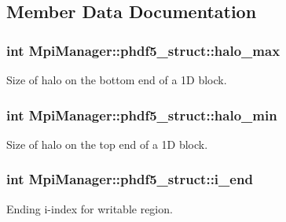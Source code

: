 \subsection{Member Data Documentation}
\subsubsection[{\texorpdfstring{halo\+\_\+max}{halo_max}}]{\setlength{\rightskip}{0pt plus 5cm}int Mpi\+Manager\+::phdf5\+\_\+struct\+::halo\+\_\+max}\hypertarget{struct_mpi_manager_1_1phdf5__struct_af6509514433ef18c04217b54ce4614a0}{}\label{struct_mpi_manager_1_1phdf5__struct_af6509514433ef18c04217b54ce4614a0}


Size of halo on the bottom end of a 1D block. 

\subsubsection[{\texorpdfstring{halo\+\_\+min}{halo_min}}]{\setlength{\rightskip}{0pt plus 5cm}int Mpi\+Manager\+::phdf5\+\_\+struct\+::halo\+\_\+min}\hypertarget{struct_mpi_manager_1_1phdf5__struct_a1ea3307d7dac34273ee8a7b1014273fe}{}\label{struct_mpi_manager_1_1phdf5__struct_a1ea3307d7dac34273ee8a7b1014273fe}


Size of halo on the top end of a 1D block. 

\subsubsection[{\texorpdfstring{i\+\_\+end}{i_end}}]{\setlength{\rightskip}{0pt plus 5cm}int Mpi\+Manager\+::phdf5\+\_\+struct\+::i\+\_\+end}\hypertarget{struct_mpi_manager_1_1phdf5__struct_a28567c9488624c7de401c9ee5c5fa13e}{}\label{struct_mpi_manager_1_1phdf5__struct_a28567c9488624c7de401c9ee5c5fa13e}


Ending i-\/index for writable region. 

